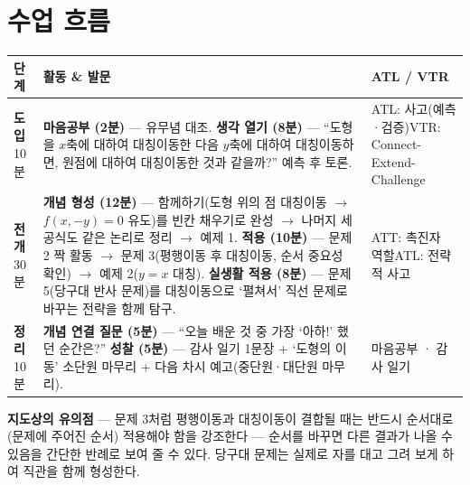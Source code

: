 \documentclass[11pt,a4paper]{article}
\begin{document}
\section{수업 흐름}
\begin{tabularx}{\linewidth}{@{}>{\centering\arraybackslash}p{1.6cm}X>{\raggedright\arraybackslash\small}p{3.1cm}@{}}
\toprule
\textbf{단계} & \textbf{활동 \& 발문} & \textbf{ATL / VTR} \\
\midrule
\textcolor{goldstrong}{\textbf{도입}}\newline\footnotesize 10분 &
\textbf{마음공부 (2분)} --- 유무념 대조.\newline
\textbf{생각 열기 (8분)} --- ``도형을 $x$축에 대하여 대칭이동한 다음 $y$축에 대하여 대칭이동하면, 원점에 대하여 대칭이동한 것과 같을까?'' 예측 후 토론. &
ATL: 사고(예측·검증)\newline VTR: Connect-Extend-Challenge \\
\addlinespace
\textcolor{goldstrong}{\textbf{전개}}\newline\footnotesize 30분 &
\textbf{개념 형성 (12분)} --- 함께하기(도형 위의 점 대칭이동 $\to$ $f(x,-y)=0$ 유도)를 빈칸 채우기로 완성 $\to$ 나머지 세 공식도 같은 논리로 정리 $\to$ 예제 1.\newline
\textbf{적용 (10분)} --- 문제 2 짝 활동 $\to$ 문제 3(평행이동 후 대칭이동, 순서 중요성 확인) $\to$ 예제 2($y=x$ 대칭).\newline
\textbf{실생활 적용 (8분)} --- 문제 5(당구대 반사 문제)를 대칭이동으로 `펼쳐서' 직선 문제로 바꾸는 전략을 함께 탐구. &
ATT: 촉진자 역할\newline ATL: 전략적 사고 \\
\addlinespace
\textcolor{goldstrong}{\textbf{정리}}\newline\footnotesize 10분 &
\textbf{개념 연결 질문 (5분)} --- ``오늘 배운 것 중 가장 `아하!' 했던 순간은?''\newline
\textbf{성찰 (5분)} --- 감사 일기 1문장 + `도형의 이동' 소단원 마무리 + 다음 차시 예고(중단원·대단원 마무리). &
마음공부 · 감사 일기 \\
\bottomrule
\end{tabularx}

\begin{calloutbox}
\textbf{지도상의 유의점} --- 문제 3처럼 평행이동과 대칭이동이 결합될 때는 반드시 순서대로(문제에 주어진 순서) 적용해야 함을 강조한다 --- 순서를 바꾸면 다른 결과가 나올 수 있음을 간단한 반례로 보여 줄 수 있다. 당구대 문제는 실제로 자를 대고 그려 보게 하여 직관을 함께 형성한다.
\end{calloutbox}
\end{document}
